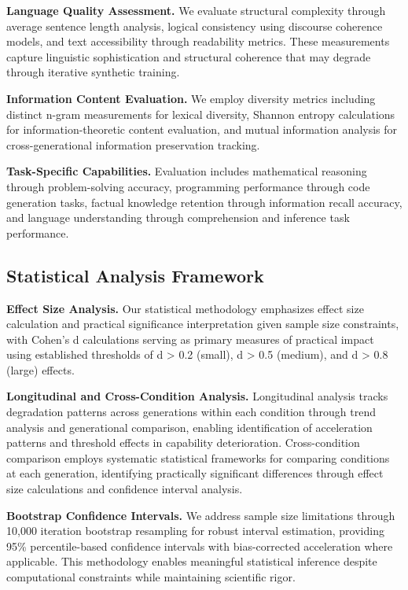\documentclass{article}
\begin{document}
\textbf{Language Quality Assessment.} We evaluate structural complexity through average sentence length analysis, logical consistency using discourse coherence models, and text accessibility through readability metrics. These measurements capture linguistic sophistication and structural coherence that may degrade through iterative synthetic training.

\textbf{Information Content Evaluation.} We employ diversity metrics including distinct n-gram measurements for lexical diversity, Shannon entropy calculations for information-theoretic content evaluation, and mutual information analysis for cross-generational information preservation tracking.

\textbf{Task-Specific Capabilities.} Evaluation includes mathematical reasoning through problem-solving accuracy, programming performance through code generation tasks, factual knowledge retention through information recall accuracy, and language understanding through comprehension and inference task performance.

\subsection{Statistical Analysis Framework}

\textbf{Effect Size Analysis.} Our statistical methodology emphasizes effect size calculation and practical significance interpretation given sample size constraints, with Cohen's d calculations serving as primary measures of practical impact using established thresholds of d > 0.2 (small), d > 0.5 (medium), and d > 0.8 (large) effects.

\textbf{Longitudinal and Cross-Condition Analysis.} Longitudinal analysis tracks degradation patterns across generations within each condition through trend analysis and generational comparison, enabling identification of acceleration patterns and threshold effects in capability deterioration. Cross-condition comparison employs systematic statistical frameworks for comparing conditions at each generation, identifying practically significant differences through effect size calculations and confidence interval analysis.

\textbf{Bootstrap Confidence Intervals.} We address sample size limitations through 10,000 iteration bootstrap resampling for robust interval estimation, providing 95\% percentile-based confidence intervals with bias-corrected acceleration where applicable. This methodology enables meaningful statistical inference despite computational constraints while maintaining scientific rigor.
\end{document}
